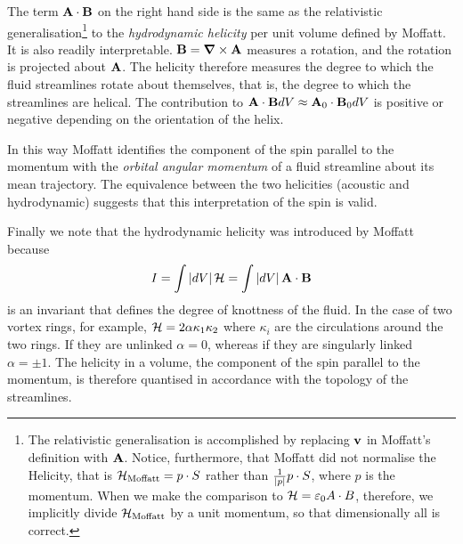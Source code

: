  The term $\textbf{A} \cdot \mathbf{B}$ on the right hand side is the same as the 
relativistic generalisation\footnote{ \label{footnote:dimensionallity_footnote}
The relativistic generalisation is accomplished by replacing $\textbf{v}$ in Moffatt's definition with $\textbf{A}$.
Notice, furthermore, that Moffatt did not normalise the Helicity,
that is ${\cal H}_{\text{Moffatt}} = p\cdot S$ rather than $\frac{1}{\left| p \right|}p\cdot S$,
where $p$ is the momentum.
When we make the comparison to ${\cal H} = \varepsilon_0 A\cdot B$, therefore,
we implicitly divide ${\cal H}_{\text{Moffatt}}$ by a unit momentum,
so that dimensionally all is correct.
} to the
{\em hydrodynamic helicity} per unit volume defined by Moffatt\cite{Moffatt1969}.
It is also  readily interpretable.
$\mathbf{B} = \mbox{\boldmath $\nabla$} \times \textbf{A}$ measures a rotation,
and the rotation is projected about  $\textbf{A}$.
The helicity therefore measures the degree to which the fluid streamlines rotate about themselves,
that is, the degree to which the streamlines are helical\cite{Moffatt1969, Ranada1992}.
The contribution to $\textbf{A} \cdot \mathbf{B} dV \approx \textbf{A}_0\cdot \mathbf{B}_0 dV$
is positive or negative depending on the orientation of the helix\cite{Moffatt1969}.

In this way Moffatt identifies the component of the spin parallel to the momentum
with the {\em orbital angular momentum} of a fluid streamline about its mean trajectory.
The equivalence between the two helicities (acoustic and hydrodynamic)
suggests that this interpretation of the spin is valid.

Finally we note that the hydrodynamic helicity was introduced by Moffatt because 
\begin{align}
  I = \int \left| dV \right| {\cal H} = \int \left| dV \right| \textbf{A} \cdot \mathbf{B}
\end{align}
is an invariant that defines the degree of knottness of the fluid.
In the case of two vortex rings, for example, ${\cal H} =2 \alpha \kappa_1 \kappa_2$ 
where $\kappa_i$ are the circulations around the two rings. %
If they are unlinked $\alpha = 0$, whereas if they are singularly linked $\alpha = \pm 1$.
The helicity in a volume, the component of the spin parallel to the momentum, is therefore quantised
in accordance with the topology of the streamlines.

